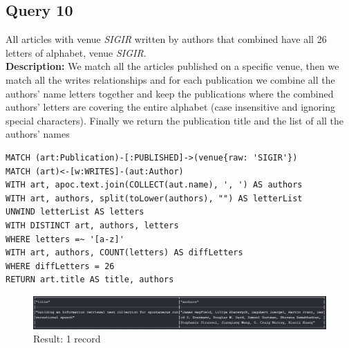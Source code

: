 \documentclass{Configuration_Files/PoliMi3i_thesis}
\begin{document}
\subsection{Query 10}
All articles with venue \emph{SIGIR} written by authors that combined have all 26 letters of alphabet, venue \emph{SIGIR}.\\
\textbf{Description:} We match all the articles published on a specific venue, then we match all the writes relationships
and for each publication we combine all the authors' name letters together and keep the publications where the combined
authors' letters are covering the entire alphabet (case insensitive and ignoring special characters). Finally we return
the publication title and the list of all the authors' names
\begin{lstlisting}[language=cypher, label=lst:cypher-example]
MATCH (art:Publication)-[:PUBLISHED]->(venue{raw: 'SIGIR'})
MATCH (art)<-[w:WRITES]-(aut:Author)
WITH art, apoc.text.join(COLLECT(aut.name), ', ') AS authors
WITH art, authors, split(toLower(authors), "") AS letterList
UNWIND letterList AS letters
WITH DISTINCT art, authors, letters
WHERE letters =~ '[a-z]'
WITH art, authors, COUNT(letters) AS diffLetters
WHERE diffLetters = 26
RETURN art.title AS title, authors
\end{lstlisting}
\begin{figure}[H]
\centering
\includegraphics[width=1\textwidth]{query/query10.PNG}
\caption{Result: 1 record}
\label{fig:query10}
\end{figure}
\end{document}
